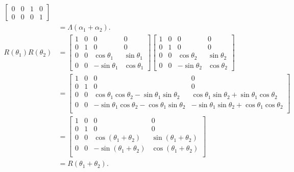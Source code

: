 \documentclass{article}
\begin{document}
\begin{enumerate}[label=(\alph*)]
\begin{align*}
\begin{bmatrix}
                                                0 & 0 & 1 & 0 \\
                                                0 & 0 & 0 & 1
                                            \end{bmatrix} \\
                                            &= \Lambda(\alpha_1 + \alpha_2). \\
            R(\theta_1) R(\theta_2) &= \begin{bmatrix}
                1 & 0 & 0 & 0 \\
                0 & 1 & 0 & 0 \\
                0 & 0 & \cos \theta_1 & \sin \theta_1 \\
                0 & 0 & -\sin \theta_1 & \cos \theta_1
            \end{bmatrix} \begin{bmatrix}
                1 & 0 & 0 & 0 \\
                0 & 1 & 0 & 0 \\
                0 & 0 & \cos \theta_2 & \sin \theta_2 \\
                0 & 0 & -\sin \theta_2 & \cos \theta_2
            \end{bmatrix} \\
            &= \begin{bmatrix}
                1 & 0 & 0 & 0 \\
                0 & 1 & 0 & 0 \\
                0 & 0 & \cos \theta_1 \cos \theta_2 - \sin \theta_1 \sin \theta_2 & \cos \theta_1 \sin \theta_2 + \sin \theta_1 \cos \theta_2 \\
                0 & 0 & -\sin \theta_1 \cos \theta_2 - \cos \theta_1 \sin \theta_2 & - \sin \theta_1 \sin \theta_2 + \cos \theta_1 \cos \theta_2 \\
            \end{bmatrix} \\
            &= \begin{bmatrix}
                1 & 0 & 0 & 0 \\
                0 & 1 & 0 & 0 \\
                0 & 0 & \cos(\theta_1 + \theta_2) & \sin(\theta_1 + \theta_2) \\
                0 & 0 & -\sin(\theta_1 + \theta_2) & \cos(\theta_1 + \theta_2) \\
            \end{bmatrix} \\
            &= R(\theta_1 + \theta_2).
\end{align*}
\end{enumerate}
\end{document}

